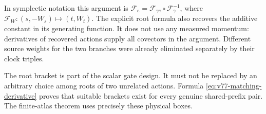 In symplectic notation this argument is
$\mathcal F_e=\mathcal F_{\gamma e}\circ\mathcal F_\gamma^{-1}$,
where $\mathcal F_W:(s,-W_s)\mapsto(t,W_t)$.  The explicit root
formula also recovers the additive constant in its generating function.
It does not use any measured momentum: derivatives of recovered actions
supply all covectors in the argument.  Different source weights for the
two branches were already eliminated separately by their clock triples.

The root bracket is part of the scalar gate design.  It must not be
replaced by an arbitrary choice among roots of two unrelated actions.
Formula \eqref{eq:v77-matching-derivative} proves that suitable brackets
exist for every genuine shared-prefix pair.  The finite-atlas theorem
uses precisely these physical boxes.
